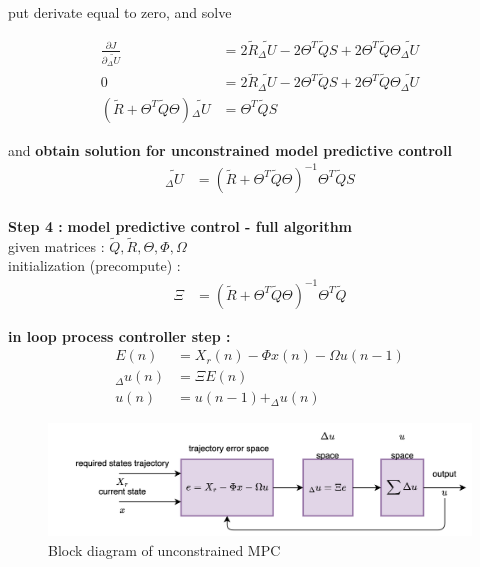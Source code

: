 \documentclass[12pt,twoside,onecolumn,openany,extrafontsizes,dvipsnames]{memoir}
\begin{document}
        put derivate equal to zero, and solve

        \begin{align}
            \frac{\partial J}{\partial {\tilde{_\Delta U}}} & = 2 \tilde{R} \tilde{_\Delta U} - 2\Theta^T\tilde{Q}S + 2\Theta^T\tilde{Q}\Theta\tilde{_\Delta U} \\
            0 &= 2 \tilde{R} \tilde{_\Delta U} - 2\Theta^T\tilde{Q}S + 2\Theta^T\tilde{Q}\Theta\tilde{_\Delta U} \nonumber \\
            (\tilde{R} + \Theta^T\tilde{Q}\Theta)\tilde{_\Delta U}  &= \Theta^T\tilde{Q}S \nonumber 
            \label{eq:mpc_zero_solving} 
        \end{align}  
      
        and \textbf{obtain solution for unconstrained model predictive controll}
        \begin{align}
            \tilde{_\Delta U} &= (\tilde{R} + \Theta^T\tilde{Q}\Theta)^{-1} \Theta^T\tilde{Q}S \\
            \label{eq:mpc_solution} 
        \end{align}     

        \textbf{Step 4 : } \textbf{model predictive control - full algorithm} \\
        given matrices : $\tilde{Q}, \tilde{R}, \Theta, \Phi, \Omega$ \\
        initialization (precompute) :
        \begin{align}
            \Xi &= (\tilde{R} + \Theta^T\tilde{Q}\Theta)^{-1} \Theta^T\tilde{Q}
            \label{eq:mpc_fast_solution_1}
        \end{align}
        
        \textbf{in loop process controller step :}
        \begin{align}
            E(n) &= X_r(n) - \Phi x(n) - \Omega u(n-1) \\
            _\Delta u(n) &= \Xi E(n) \nonumber \\
            u(n) &= u(n-1) + _\Delta u(n) \nonumber
            \label{eq:mpc_fast_solution_2}
        \end{align}
        
        \begin{figure}[!htb]
            \centering
            \includegraphics[scale=0.8]{../diagrams/control/control-mpc.png}
            \caption{Block diagram of unconstrained MPC}
            \label{fig:mpc_block}
        \end{figure}
      
\end{document}
